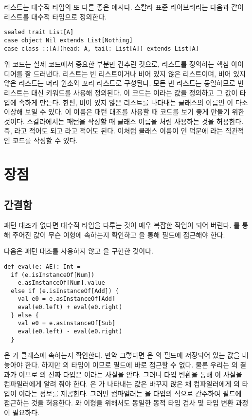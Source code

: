 리스트는 대수적 타입의 또 다른 좋은 예시다. 스칼라 표준 라이브러리는 다음과 같이
리스트를 대수적 타입으로 정의한다.

\begin{verbatim}
sealed trait List[A]
case object Nil extends List[Nothing]
case class ::[A](head: A, tail: List[A]) extends List[A]
\end{verbatim}

위 코드는 실제 코드에서 중요한 부분만 간추린 것으로, 리스트를 정의하는 핵심
아이디어를 잘 드러낸다. 리스트는 빈 리스트이거나 비어 있지 않은 리스트이며, 비어
있지 않은 리스트는 머리 원소와 꼬리 리스트로 구성된다. 모든 빈 리스트는
동일하므로 빈 리스트는  대신  키워드를 사용해 정의된다.
이 코드는 이라는 값을 정의하고 그 값이  타입에 속하게
만든다. 한편, 비어 있지 않은 리스트를 나타내는 클래스의 이름인 \code{::}이 다소
이상해 보일 수 있다. 이 이름은 패턴 대조를 사용할 때 코드를 보기 좋게 만들기
위한 것이다. 스칼라에서는 패턴을 작성할 때 클래스 이름을 처럼 사용하는 것을 허용한다. 즉, 라고 적어도 되고 라고 적어도 된다. 이처럼 클래스 이름이
\code{::}인 덕분에 라는 직관적인 코드를 작성할 수 있다.

\section{장점}

\subsection{간결함}

패턴 대조가 없다면 대수적 타입을 다루는 것이 매우 복잡한 작업이 되어 버린다.
를 통해 주어진 값이 무슨 이형에 속하는지
확인하고 을 통해 필드에 접근해야 한다.

다음은 패턴 대조를 사용하지 않고 을 구현한 것이다.

\begin{verbatim}
def eval(e: AE): Int =
  if (e.isInstanceOf[Num])
    e.asInstanceOf[Num].value
  else if (e.isInstanceOf[Add]) {
    val e0 = e.asInstanceOf[Add]
    eval(e0.left) + eval(e0.right)
  } else {
    val e0 = e.asInstanceOf[Sub]
    eval(e0.left) - eval(e0.right)
  }
\end{verbatim}

은 가  클래스에 속하는지 확인한다.
만약 그렇다면 은 의  필드에 저장되어 있는 값을
내놓아야 한다. 하지만 의 타입이 이므로  필드에 바로
접근할 수 없다. 물론 우리는 의 결과가
이므로 의 진짜 타입은 이라는 사실을 안다. 그러니
타입 변환을 통해 이 사실을 컴파일러에게 알려 줘야 한다.
은 가 나타내는 값은 바꾸지 않은 채
컴파일러에게 의 타입이 이라는 정보를 제공한다. 그러면
컴파일러는 을  타입의 식으로 간주하여
 필드에 접근하는 것을 허용한다. 와  이형을
위해서도 동일한 동적 타입 검사 및 타입 변환 과정이 필요하다.

